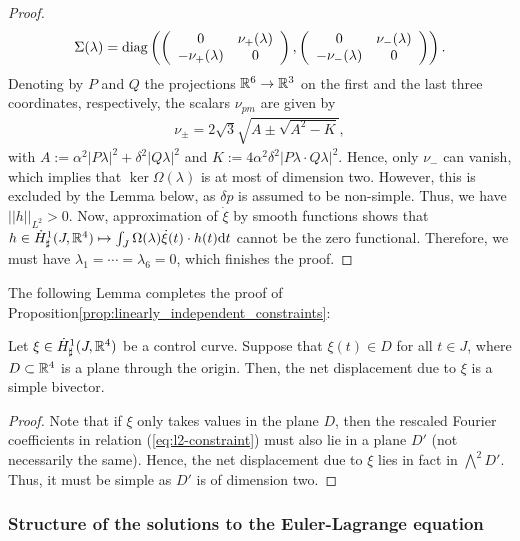 \begin{proof}
\begin{align}
\Sigma(\lambda) = \operatorname{diag} \left (\left( \begin{array}{cc}
0 & \nu_+(\lambda) \\ 
- \nu_+ (\lambda) & 0
\end{array} \right ) , \left ( \begin{array}{cc}
0 & \nu_{-}(\lambda) \\ 
- \nu_{-}(\lambda) & 0
\end{array} \right ) \right ).
\end{align}
Denoting by $P$ and $Q$ the projections $\mathbb{R}^6 \to \mathbb{R}^3$ on the first and the last three coordinates, respectively, the scalars $\nu_{pm}$ are given by
\begin{align}
	\nu_{\pm} = 2 \sqrt{3} \sqrt{A \pm \sqrt{A^2 - K}},
\end{align}
with $A := \alpha^2 |P \lambda|^2 + \delta^2 |Q \lambda|^2$ and $K := 4 \alpha^2 \delta^2 |P\lambda \cdot Q \lambda|^2$. Hence, only $\nu_-$ can vanish, which implies that $\ker \Omega(\lambda)$ is at most of dimension two. However, this is excluded by the Lemma below, as $\delta p$ is assumed to be non-simple. Thus, we have $||h||_{L^2} > 0$. Now, approximation of $\dot{\xi}$ by smooth functions shows that $h \in \dot{H}^{1}_{\sharp}(J, \mathbb{R}^4) \mapsto \int_J \Omega(\lambda) \dot{\xi}(t) \cdot h(t) \mathrm{d}t$ cannot be the zero functional. Therefore, we must have $\lambda_1 = \dotsm = \lambda_6 = 0$, which finishes the proof.
\end{proof}

The following Lemma completes the proof of Proposition\ref{prop:linearly_independent_constraints}:
\begin{lemma}
	Let $\xi \in \dot{H}^{1}_{\sharp}(J, \mathbb{R}^4)$ be a control curve. Suppose that $\xi(t) \in D$ for all $t \in J$, where $D \subset \mathbb{R}^4$ is a plane through the origin. Then, the net displacement due to $\xi$ is a simple bivector.
\end{lemma}

\begin{proof}
Note that if $\xi$ only takes values in the plane $D$, then the rescaled Fourier coefficients in relation (\ref{eq:l2-constraint}) must also lie in a plane $D'$ (not necessarily the same). Hence, the net displacement due to $\xi$ lies in fact in $\bigwedge^2 D'$. Thus, it must be simple as $D'$ is of dimension two.
\end{proof}

\subsubsection{Structure of the solutions to the Euler-Lagrange equation}

